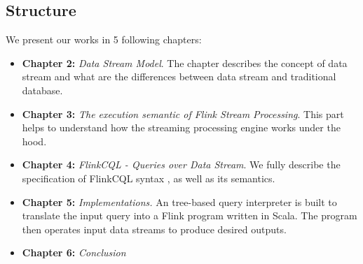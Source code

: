 \subsection*{Structure}
We present our works in 5 following chapters:
\begin{itemize}
	\item \textbf{Chapter 2:} \textit{Data Stream Model}. The chapter describes the concept of data stream and what are the differences between data stream and traditional database. 
	
	\item \textbf{Chapter 3:} \textit{The execution semantic of  Flink Stream Processing}. This part helps to understand how the streaming processing engine works under the hood.
	
	\item \textbf{Chapter 4:} \textit{FlinkCQL - Queries over Data Stream}. We fully describe the specification of FlinkCQL syntax , as well as its semantics.
	
	\item \textbf{Chapter 5:} \textit{Implementations.} An tree-based query interpreter is built to translate the input query into a Flink program written in Scala. The program then operates input data streams to produce desired outputs.
	
	\item \textbf{Chapter 6:} \textit{Conclusion}
\end{itemize}

